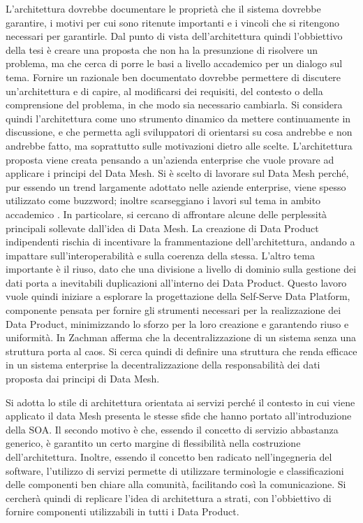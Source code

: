 \documentclass[a4paper,12pt]{report}
\begin{document}
L'architettura dovrebbe documentare le proprietà che il sistema dovrebbe garantire, i motivi per cui sono ritenute importanti e i vincoli che si ritengono necessari per garantirle.
Dal punto di vista dell'architettura quindi l'obbiettivo della tesi è creare una proposta che non ha la presunzione di risolvere un problema, ma che cerca di porre le basi a livello accademico per un dialogo sul tema. 
Fornire un razionale ben documentato dovrebbe permettere di discutere un'architettura e di capire, al modificarsi dei requisiti, del contesto o della comprensione del problema, in che modo sia necessario cambiarla.
Si considera quindi l'architettura come uno strumento dinamico da mettere continuamente in discussione, e che permetta agli sviluppatori di orientarsi su cosa andrebbe e non andrebbe fatto, ma soprattutto sulle motivazioni dietro alle scelte.
L'architettura proposta viene creata pensando a un'azienda enterprise che vuole provare ad applicare i principi del Data Mesh.
Si è scelto di lavorare sul Data Mesh perché, pur essendo un trend largamente adottato nelle aziende enterprise, viene spesso utilizzato come buzzword; inoltre scarseggiano i lavori sul tema in ambito accademico \cite{goedegebuure2023data}.
In particolare, si cercano di affrontare alcune delle perplessità principali sollevate dall'idea di Data Mesh.
La creazione di Data Product indipendenti rischia di incentivare la frammentazione dell'architettura, andando a impattare sull'interoperabilità e sulla coerenza della stessa.
L'altro tema importante è il riuso, dato che una divisione a livello di dominio sulla gestione dei dati porta a inevitabili duplicazioni all'interno dei Data Product.
Questo lavoro vuole quindi iniziare a esplorare la progettazione della Self-Serve Data Platform, componente pensata per fornire gli strumenti necessari per la realizzazione dei Data Product, minimizzando lo sforzo per la loro creazione e garantendo riuso e uniformità.
In \cite{zachman1987framework} Zachman afferma che la decentralizzazione di un sistema senza una struttura porta al caos. 
Si cerca quindi di definire una struttura che renda efficace in un sistema enterprise la decentralizzazione della responsabilità dei dati proposta dai principi di Data Mesh.

Si adotta lo stile di architettura orientata ai servizi perché il contesto in cui viene applicato il data Mesh presenta le stesse sfide che hanno portato all'introduzione della SOA. 
Il secondo motivo è che, essendo il concetto di servizio abbastanza generico, è garantito un certo margine di flessibilità nella costruzione dell'architettura.
Inoltre, essendo il concetto ben radicato nell'ingegneria del software, l'utilizzo di servizi permette di utilizzare terminologie e classificazioni delle componenti ben chiare alla comunità, facilitando così la comunicazione.
Si cercherà quindi di replicare l'idea di architettura a strati, con l'obbiettivo di fornire componenti utilizzabili in tutti i Data Product.
\end{document}
